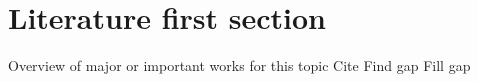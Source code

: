 \section{Literature first section}
Overview of major or important works for this topic
Cite
Find gap
Fill gap
%
%
